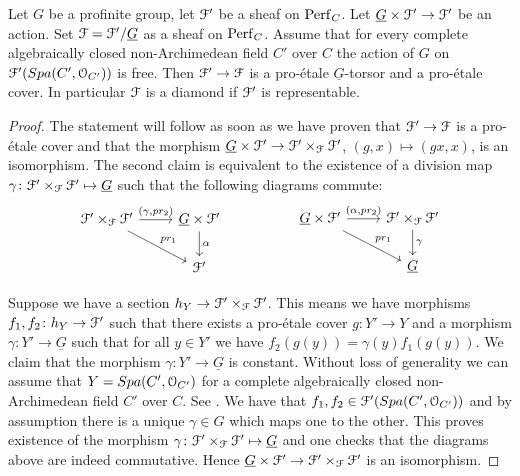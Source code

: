 \begin{prop}\label{torsorprop1}
Let $G$ be a profinite group, let $\mathcal{F}'$ be a sheaf on $\mathrm{Perf}_{C}$.
Let $\underline{G}\times\mathcal{F}'\to\mathcal{F}'$ be an action. 
Set $\mathcal{F} = \mathcal{F}'/\underline{G}$ as a sheaf on $\mathrm{Perf}_{C}$.
Assume that for every complete algebraically closed non-Archimedean field $C'$ over $C$ the action of $G$ on
$\mathcal{F}'({Spa({C'},{\mathcal{O}_{C'}})})$ is free. Then
$\mathcal{F}'\to\mathcal{F}$ is a  pro-\'{e}tale $\underline{G}$-torsor and a pro-\'{e}tale cover.
In particular $\mathcal{F}$ is a diamond if $\mathcal{F}'$ is representable.
\end{prop}
\begin{proof}
The statement will follow as soon as we have proven that
$\mathcal{F}'\to\mathcal{F}$ is a pro-\'{e}tale cover and that the morphism
$\underline{G}\times\mathcal{F}'\to \mathcal{F}'\times_{\mathcal{F}}\mathcal{F}'$, $(g,x)\mapsto (gx,x)$, 
is an isomorphism. The second claim is equivalent to the existence of a division map $\gamma\colon\mathcal{F}'\times_{\mathcal{F}}\mathcal{F}'\mapsto\underline{G}$ such that the following diagrams commute:
$$\begin{tikzcd}
\F'\times_{\F}\F' \arrow[rd, "pr_{1}"] \arrow[r, "{(\gamma, pr_{2})}"] & \underline{G}\times\F' \arrow[d, "\alpha"]\\
				     					        & \F'
\end{tikzcd}\hspace{1.7cm}
\begin{tikzcd}
\underline{G}\times\F' \arrow[rd, "pr_{1}"] \arrow[r, "{(\alpha, pr_{2})}"] & \F'\times_{\F}\F' \arrow[d, "\gamma"]\\
				                                                                      & \underline{G}
\end{tikzcd}$$

Suppose we have a section ${h_{Y}}\to\mathcal{F}'\times_{\mathcal{F}}\mathcal{F}'$. This means we have morphisms $f_1, f_2\colon {h_{Y}}\to\mathcal{F}'$ such that there exists a pro-\'{e}tale cover $g\colon Y'\to Y$ and a morphism
$\gamma\colon Y'\to \underline{G}$ such that for all $y\in Y'$ we have $f_2(g(y))=\gamma(y)f_1(g(y))$. We claim that the morphism $\gamma\colon Y'\to\underline{G}$ is constant. Without loss of generality we can assume that
$Y={Spa({C'},{\mathcal{O}_{C'}})}$ for a complete algebraically closed non-Archimedean field $C'$ over $C$. See \cite[lemma 5.4]{Scholzeetcoh21}. 
We have that $f_1, f_2\in\mathcal{F}'({Spa({C'},{\mathcal{O}_{C'}})})$ and by assumption there is a unique $\gamma\in G$ which maps one to the other. This proves existence of the morphism
 $\gamma\colon\mathcal{F}'\times_{\mathcal{F}}\mathcal{F}'\mapsto\underline{G}$ and one checks that the diagrams above are indeed commutative. Hence 
$\underline{G}\times\mathcal{F}'\to \mathcal{F}'\times_{\mathcal{F}}\mathcal{F}'$ is an isomorphism.


\end{proof}
